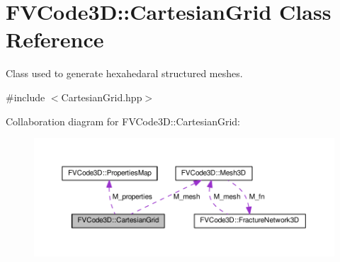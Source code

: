\hypertarget{classFVCode3D_1_1CartesianGrid}{}\section{F\+V\+Code3D\+:\+:Cartesian\+Grid Class Reference}
\label{classFVCode3D_1_1CartesianGrid}


Class used to generate hexahedaral structured meshes.  




{\ttfamily \#include $<$Cartesian\+Grid.\+hpp$>$}



Collaboration diagram for F\+V\+Code3D\+:\+:Cartesian\+Grid\+:
\nopagebreak
\begin{figure}[H]
\begin{center}
\leavevmode
\includegraphics[width=350pt]{classFVCode3D_1_1CartesianGrid__coll__graph}
\end{center}
\end{figure}
